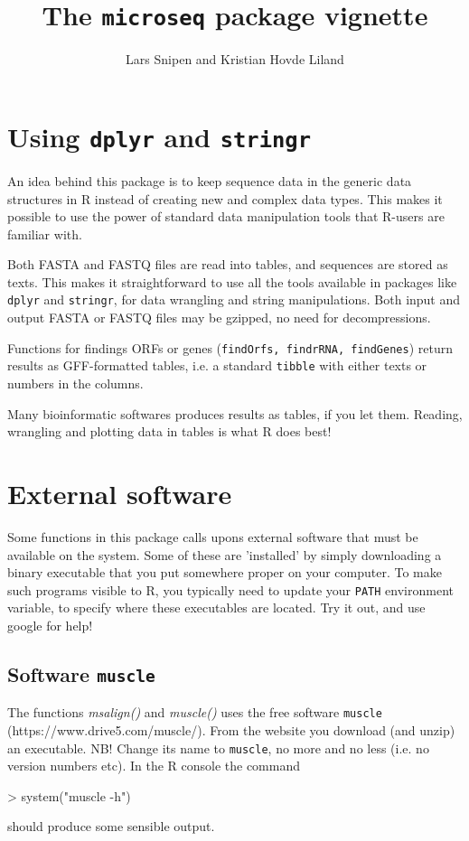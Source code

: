 \documentclass{article}
\title{The \texttt{microseq} package vignette}
\author{Lars Snipen and Kristian Hovde Liland}
\date{}
\begin{document}

\maketitle


\section{Using \texttt{dplyr} and \texttt{stringr}}
An idea behind this package is to keep sequence data in the generic data structures in R instead of creating new and complex data types. This makes it possible to use the power of standard data manipulation tools that R-users are familiar with.

Both FASTA and FASTQ files are read into tables, and sequences are stored as texts. This makes it straightforward to use all the tools available in packages like \texttt{dplyr} and \texttt{stringr}, for data wrangling and string manipulations. Both input and output FASTA or FASTQ files may be gzipped, no need for decompressions.

Functions for findings ORFs or genes (\texttt{findOrfs, findrRNA, findGenes}) return results as GFF-formatted tables, i.e. a standard \texttt{tibble} with either texts or numbers in the columns.

Many bioinformatic softwares produces results as tables, if you let them. Reading, wrangling and plotting data in tables is what R does best!




\section{External software}
Some functions in this package calls upons external software that must be available on the system. Some of these are 'installed' by simply downloading a binary executable that you put somewhere proper on your computer. To make such programs visible to R, you typically need to update your \texttt{PATH} environment variable, to specify where these executables are located. Try it out, and use google for help!


\subsection{Software \texttt{muscle}}
The functions \emph{msalign()} and \emph{muscle()} uses the free software \texttt{muscle} (https://www.drive5.com/muscle/). From the website you download (and unzip) an executable. NB! Change its name to \texttt{muscle}, no more and no less (i.e. no version numbers etc). In the R console the command
\begin{Schunk}
\begin{Sinput}
> system("muscle -h")
\end{Sinput}
\end{Schunk}
should produce some sensible output.
\end{document}
